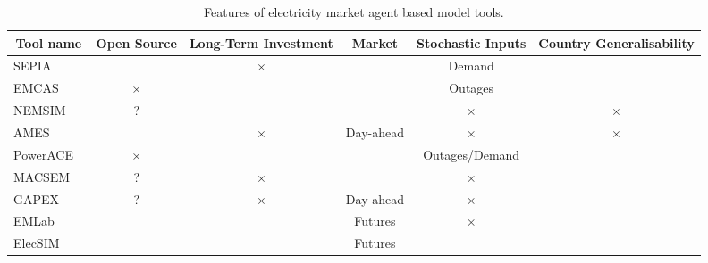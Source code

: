 \begin{table*}[]
	\begin{tabular}{lccccc} \toprule
		\multicolumn{1}{c}{\textbf{Tool name}} & \textbf{Open Source} & \textbf{Long-Term Investment} & \textbf{Market} & \textbf{Stochastic Inputs} & \textbf{Country Generalisability} \\ \midrule
		SEPIA \cite{Harp2000}  & \checkmark           & $\times$                             & \checkmark      & Demand                     & \checkmark                        \\ 
		EMCAS ~\cite{Conzelmann}   & $\times$                    & \checkmark                    & \checkmark      & Outages                    & \checkmark                        \\ 
		NEMSIM ~\cite{Batten2006}  & ?              & \checkmark                    & \checkmark      & $\times$                          & $\times$                                 \\ 
		AMES  ~\cite{Sun2007} & \checkmark           & $\times$                             & Day-ahead       & $\times$                          & $\times$                                 \\ 
		PowerACE ~\cite{Rothengatter2007} & $\times$                    & \checkmark                    & \checkmark      & Outages/Demand             & \checkmark                        \\ 
		MACSEM  ~\cite{Praca2003}  & ?              & $\times$                             & \checkmark      & $\times$                          & \checkmark                        \\ 
		GAPEX  ~\cite{Cincotti2013} & ?              & $\times$                             & Day-ahead       & $\times$                          & \checkmark                        \\ 
		EMLab ~\cite{Chappin2017}  & \checkmark           & \checkmark                    & Futures         & $\times$                          & \checkmark                        \\ 
		ElecSIM                                  & \checkmark           & \checkmark                    & Futures         & \checkmark                 & \checkmark                        \\ \hline
	\end{tabular}
	\caption{Features of electricity market agent based model tools.}
	\label{table:tool_comparison}
\end{table*}


